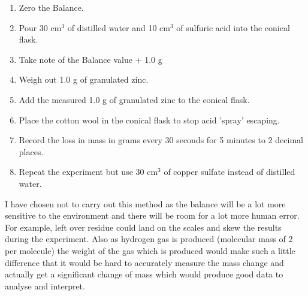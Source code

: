 \begin{enumerate}
\item Zero the Balance.
\item Pour 30 cm$^3$ of distilled water and 10 cm$^3$ of sulfuric acid into the conical flask.
\item Take note of the Balance value + 1.0 g
\item Weigh out 1.0 g of granulated zinc.
\item Add the measured 1.0 g of granulated zinc to the conical flask.
\item Place the cotton wool in the conical flask to stop acid 'spray' escaping.
\item Record the loss in mass in grams every 30 seconds for 5 minutes to 2 decimal places.
\item Repeat the experiment but use 30 cm$^3$ of copper sulfate instead of distilled water.
\end{enumerate} 

I have chosen not to carry out this method as the balance will be a lot more sensitive to the environment and there will be room for a lot more human error. For example, left over residue could land on the scales and skew the results during the experiment. Also as hydrogen gas is produced (molecular mass of 2 per molecule) the weight of the gas which is produced would make such a little difference that it would be hard to accurately measure the mass change and actually get a significant change of mass which would produce good data to analyse and interpret. 


